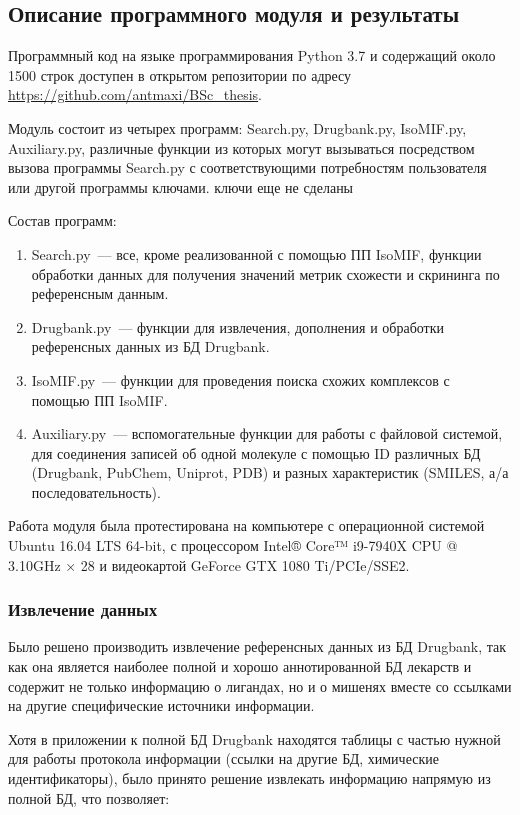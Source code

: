 \documentclass[a4paper,14pt]{article}         %
\newcommand{\sic}[1]{\LARGE\color{orange}{#1}\color{black}\Large}
\begin{document}
\subsection{Описание программного модуля и результаты}
Программный код на языке программирования Python 3.7 \cite{python37} и содержащий около 1500 строк доступен в открытом репозитории по адресу \href{https://github.com/antmaxi/BSc\_thesis}{https://github.com/antmaxi/BSc\_thesis}.

Модуль состоит из четырех программ: Search.py, Drugbank.py, IsoMIF.py, Auxiliary.py, различные функции из которых могут вызываться посредством вызова программы Search.py с соответствующими потребностям пользователя или другой программы ключами. \color{orange} ключи еще не сделаны \color{black}

Состав программ:
\begin{enumerate}
	\item Search.py~--- все, кроме реализованной с помощью ПП IsoMIF, функции обработки данных для получения значений метрик схожести и скрининга по референсным данным.
	\item Drugbank.py~--- функции для извлечения, дополнения и обработки референсных данных из БД Drugbank.
	\item IsoMIF.py~--- функции для проведения поиска схожих комплексов с помощью ПП IsoMIF.
	\item Auxiliary.py~--- вспомогательные функции для работы с файловой системой, для соединения записей об одной молекуле с помощью ID различных БД (Drugbank, PubChem, Uniprot, PDB) и разных характеристик (SMILES, а/а последовательность).
\end{enumerate}

Работа модуля была протестирована на компьютере с операционной системой Ubuntu 16.04 LTS 64-bit, с процессором Intel® Core™ i9-7940X CPU @ 3.10GHz $\times$ 28 и видеокартой GeForce GTX 1080 Ti/PCIe/SSE2.
\subsubsection{Извлечение данных}
Было решено производить извлечение референсных данных из БД Drugbank, так как она является наиболее полной и хорошо аннотированной БД лекарств \sic{cite{}} и содержит не только информацию о лигандах, но и о мишенях вместе со ссылками на другие специфические источники информации. 

Хотя в приложении к полной БД Drugbank находятся таблицы с частью нужной для работы протокола информации (ссылки на другие БД, химические идентификаторы), было принято решение извлекать информацию напрямую из полной БД, что позволяет: 
\end{document}
